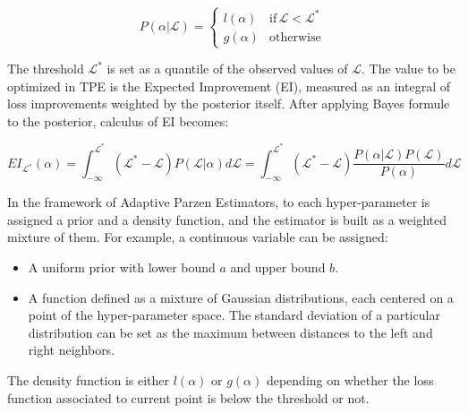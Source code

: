   \begin{equation}
    P(\alpha \vert \mathcal L) =
      \begin{cases}
        l(\alpha) &  \text{if} \, \mathcal L < \mathcal L^* \\
        g(\alpha) &  \text{otherwise}
      \end{cases}
  \end{equation}

  The threshold $\mathcal L^*$ is set as a quantile of the observed values of $\mathcal L$.
  The value to be optimized in TPE is the Expected Improvement (EI), measured as an integral
  of loss improvements weighted by the posterior itself.
  After applying Bayes formule to the posterior, calculus of EI becomes:

  \begin{equation}
    EI_{\mathcal L^*}(\alpha) = \int_{-\infty}^{\mathcal L^*} (\mathcal L^* - \mathcal L) P(\mathcal L \vert \alpha) d\mathcal L
    = \int_{-\infty}^{\mathcal L^*} (\mathcal L^* - \mathcal L) \frac{P(\alpha \vert \mathcal L) P(\mathcal L)}{P(\alpha)} d\mathcal L
  \end{equation}

  In the framework of Adaptive Parzen Estimators, to each hyper-parameter is assigned a prior and a density function,
  and the estimator is built as a weighted mixture of them.
  For example, a continuous variable can be assigned:
  \begin{itemize}
    \item A uniform prior with lower bound $a$ and upper bound $b$.
    \item A function defined as a mixture of Gaussian distributions, each centered on a point of the hyper-parameter
    space. The standard deviation of a particular distribution can be set as the maximum between distances to the left and right
    neighbors.
  \end{itemize}

  The density function is either $l(\alpha)$ or $g(\alpha)$ depending on whether the loss function associated to current
  point is below the threshold or not.

